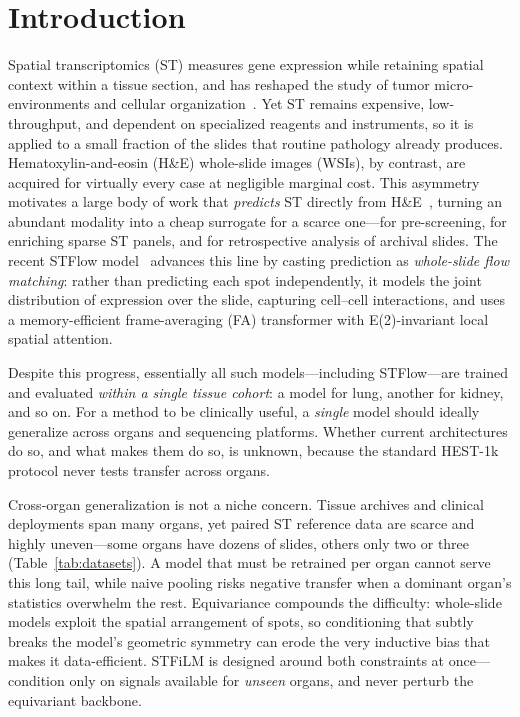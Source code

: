 \documentclass[10pt,twocolumn,letterpaper]{article}
\begin{document}
\section{Introduction}
\label{sec:intro}
Spatial transcriptomics (ST) measures gene expression while retaining spatial context within a
tissue section, and has reshaped the study of tumor micro-environments and cellular
organization~\cite{spatialtx,xenium}. Yet ST remains expensive, low-throughput, and dependent on
specialized reagents and instruments, so it is applied to a small fraction of the slides that
routine pathology already produces. Hematoxylin-and-eosin (H\&E) whole-slide images (WSIs), by
contrast, are acquired for virtually every case at negligible marginal cost. This asymmetry motivates
a large body of work that \emph{predicts} ST directly from H\&E~\cite{stnet,histogene,hist2st},
turning an abundant modality into a cheap surrogate for a scarce one---for pre-screening, for
enriching sparse ST panels, and for retrospective analysis of archival slides. The recent STFlow
model~\cite{stflow} advances this line by casting prediction as \emph{whole-slide flow
matching}: rather than predicting each spot independently, it models the joint distribution of
expression over the slide, capturing cell--cell interactions, and uses a memory-efficient
frame-averaging (FA) transformer with E(2)-invariant local spatial attention.

Despite this progress, essentially all such models---including STFlow---are trained and
evaluated \emph{within a single tissue cohort}: a model for lung, another for kidney, and so
on. For a method to be clinically useful, a \emph{single} model should ideally generalize
across organs and sequencing platforms. Whether current architectures do so, and what makes
them do so, is unknown, because the standard HEST-1k~\cite{hest} protocol never tests transfer
across organs.

Cross-organ generalization is not a niche concern. Tissue archives and clinical deployments span
many organs, yet paired ST reference data are scarce and highly uneven---some organs have dozens of
slides, others only two or three (Table~\ref{tab:datasets}). A model that must be retrained per organ
cannot serve this long tail, while naive pooling risks negative transfer when a dominant organ's
statistics overwhelm the rest. Equivariance compounds the difficulty: whole-slide models exploit the
spatial arrangement of spots, so conditioning that subtly breaks the model's geometric symmetry can
erode the very inductive bias that makes it data-efficient. STFiLM is designed around both
constraints at once---condition only on signals available for \emph{unseen} organs, and never
perturb the equivariant backbone.
\end{document}
